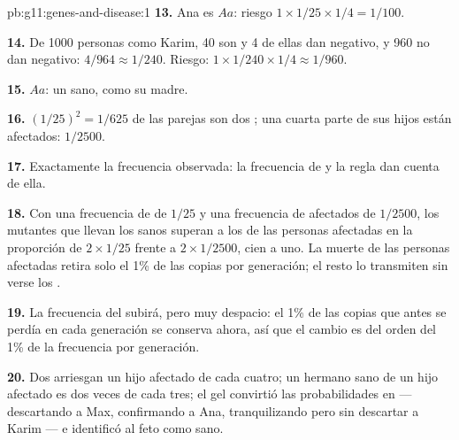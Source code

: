 \begin{solution}{pb:g11:genes-and-disease:1}
\textbf{13.} Ana es $Aa$: riesgo $1 \times 1/25 \times 1/4 = 1/100$.

\textbf{14.} De 1000 personas como Karim, 40 son  y 4 de
ellas dan negativo, y 960 no  dan negativo: $4/964 \approx
1/240$. Riesgo: $1 \times 1/240 \times 1/4 \approx 1/960$.

\textbf{15.} $Aa$: un  sano, como su madre.

\textbf{16.} $(1/25)^2 = 1/625$ de las parejas son dos ; una
cuarta parte de sus hijos están afectados: $1/2500$.

\textbf{17.} Exactamente la frecuencia observada: la frecuencia de
 y la regla  dan cuenta de ella.

\textbf{18.} Con una frecuencia de  de $1/25$ y una
frecuencia de afectados de $1/2500$, los  mutantes que llevan los
 sanos superan a los de las personas afectadas en la
proporción de $2 \times 1/25$ frente a $2 \times
1/2500$, cien a uno.
La muerte de las personas afectadas retira solo el 1\% de las copias
por generación; el resto lo transmiten sin verse los .

\textbf{19.} La frecuencia del  subirá, pero muy despacio: el 1\%
de las copias que antes se perdía en cada generación se conserva ahora,
así que el cambio es del orden del 1\% de la frecuencia por generación.

\textbf{20.} Dos  arriesgan un hijo afectado de cada cuatro;
un hermano sano de un hijo afectado es  dos veces de cada tres;
el gel convirtió las probabilidades en  --- descartando a Max,
confirmando a Ana, tranquilizando pero sin descartar a Karim --- e
identificó al feto como  sano.
\end{solution}
